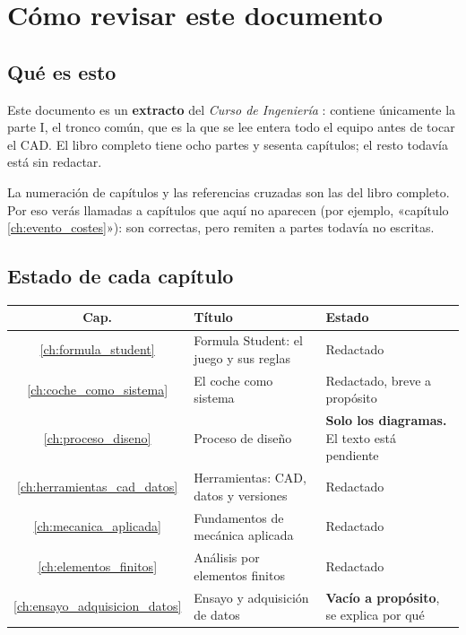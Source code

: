 \chapter*{Cómo revisar este documento}

\section*{Qué es esto}

Este documento es un \textbf{extracto} del \textit{Curso de Ingeniería \FUSAL}:
contiene únicamente la parte I, el tronco común, que es la que se lee entera todo
el equipo antes de tocar el CAD. El libro completo tiene ocho partes y sesenta
capítulos; el resto todavía está sin redactar.

La numeración de capítulos y las referencias cruzadas son las del libro completo.
Por eso verás llamadas a capítulos que aquí no aparecen (por ejemplo, «capítulo
\ref{ch:evento_costes}»): son correctas, pero remiten a partes todavía no escritas.

\section*{Estado de cada capítulo}

\begin{center}
\begin{tabularx}{\textwidth}{@{}clX@{}}
\toprule
\textbf{Cap.} & \textbf{Título} & \textbf{Estado} \\
\midrule
\ref{ch:formula_student} & Formula Student: el juego y sus reglas & Redactado \\
\ref{ch:coche_como_sistema} & El coche como sistema & Redactado, breve a propósito \\
\ref{ch:proceso_diseno} & Proceso de diseño & \textbf{Solo los diagramas.} El texto está pendiente \\
\ref{ch:herramientas_cad_datos} & Herramientas: CAD, datos y versiones & Redactado \\
\ref{ch:mecanica_aplicada} & Fundamentos de mecánica aplicada & Redactado \\
\ref{ch:elementos_finitos} & Análisis por elementos finitos & Redactado \\
\ref{ch:ensayo_adquisicion_datos} & Ensayo y adquisición de datos & \textbf{Vacío a propósito}, se explica por qué \\
\bottomrule
\end{tabularx}
\end{center}

